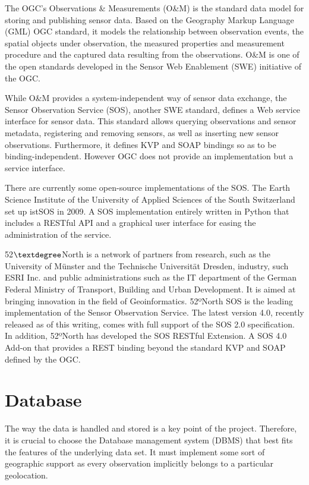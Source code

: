 The OGC's Observations \& Measurements (O\&M) \cite{OM} is the standard data model for storing and publishing sensor data. Based on the Geography Markup Language (GML) OGC standard, it models the relationship between observation events, the spatial objects under observation, the measured properties and measurement procedure and the captured data resulting from the observations. O\&M is one of the open standards developed in the Sensor Web Enablement (SWE) initiative of the OGC.

While O\&M provides a system-independent way of sensor data exchange, the Sensor Observation Service (SOS), another SWE standard, defines a Web service interface for sensor data. This standard allows querying observations and sensor metadata, registering and removing sensors, as well as inserting new sensor observations. Furthermore, it defines KVP and SOAP bindings so as to be binding-independent. However OGC does not provide an implementation but a service interface.

There are currently some open-source implementations of the SOS. The Earth Science Institute of the University of Applied Sciences of the South Switzerland set up istSOS \cite{istSOS} in 2009. A SOS implementation entirely written in Python that includes a RESTful API and a graphical user interface for easing the administration of the service.

52$\textdegree$North is a network of partners from research, such as the University of Münster and the Technische Universität Dresden, industry, such ESRI Inc. and public administrations such as the IT department of the German Federal Ministry of Transport, Building and Urban Development. It is aimed at bringing innovation in the field of Geoinformatics. 52ºNorth SOS \cite{52north-SOS} is the leading implementation of the Sensor Observation Service. The latest version 4.0, recently released as of this writing, comes with full support of the SOS 2.0 specification. In addition, 52ºNorth has developed the SOS RESTful Extension. A SOS 4.0 Add-on that provides a REST binding beyond the standard KVP and SOAP defined by the OGC.

\section{Database}

The way the data is handled and stored is a key point of the project. Therefore, it is crucial to choose the Database management system (DBMS) that best fits the features of the underlying data set. It must implement some sort of geographic support as every observation implicitly belongs to a particular geolocation.

